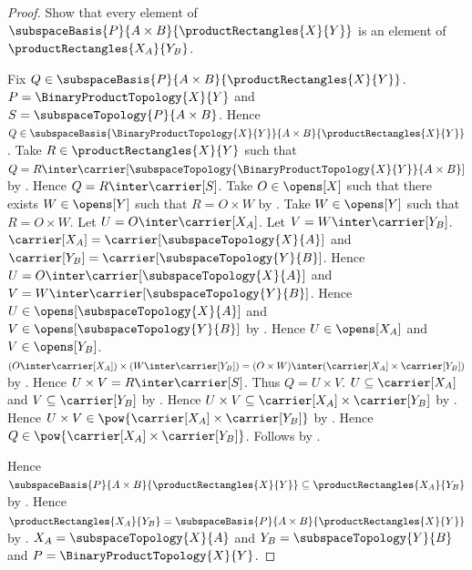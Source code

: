 \begin{proof}
    Show that every element of
        $\subspaceBasis{P}{A\times B}{\productRectangles{X}{Y}}$
        is an element of $\productRectangles{X_A}{Y_B}$.
    \begin{subproof}
        Fix $Q\in
            \subspaceBasis{P}{A\times B}{\productRectangles{X}{Y}}$.
        $P=\BinaryProductTopology{X}{Y}$ and
            $S=\subspaceTopology{P}{A\times B}$.
        Hence $Q\in\subspaceBasis{
            \BinaryProductTopology{X}{Y}}{A\times B}{
                \productRectangles{X}{Y}}$.
        Take $R\in\productRectangles{X}{Y}$ such that
            $Q=R\inter\carrier[\subspaceTopology{
                \BinaryProductTopology{X}{Y}}{A\times B}]$ by
            .
        Hence $Q=R\inter\carrier[S]$.
        Take $O\in\opens[X]$ such that there exists $W\in\opens[Y]$
            such that $R=O\times W$ by .
        Take $W\in\opens[Y]$ such that $R=O\times W$.
        Let $U=O\inter\carrier[X_A]$.
        Let $V=W\inter\carrier[Y_B]$.
        $\carrier[X_A]=\carrier[\subspaceTopology{X}{A}]$ and
            $\carrier[Y_B]=\carrier[\subspaceTopology{Y}{B}]$.
        Hence $U=O\inter\carrier[\subspaceTopology{X}{A}]$ and
            $V=W\inter\carrier[\subspaceTopology{Y}{B}]$.
        Hence $U\in\opens[\subspaceTopology{X}{A}]$ and
            $V\in\opens[\subspaceTopology{Y}{B}]$ by
            .
        Hence $U\in\opens[X_A]$ and $V\in\opens[Y_B]$.
        $(O\inter\carrier[X_A])\times
            (W\inter\carrier[Y_B])
            =(O\times W)\inter
                (\carrier[X_A]\times\carrier[Y_B])$ by
            .
        Hence $U\times V=R\inter\carrier[S]$.
        Thus $Q=U\times V$.
        $U\subseteq\carrier[X_A]$ and $V\subseteq\carrier[Y_B]$ by
            .
        Hence $U\times V\subseteq\carrier[X_A]\times\carrier[Y_B]$ by
            .
        Hence $U\times V\in\pow{\carrier[X_A]\times\carrier[Y_B]}$ by
            .
        Hence $Q\in\pow{\carrier[X_A]\times\carrier[Y_B]}$.
        Follows by .
    \end{subproof}
    Hence $\subspaceBasis{P}{A\times B}{\productRectangles{X}{Y}}
        \subseteq\productRectangles{X_A}{Y_B}$ by .
    Hence $\productRectangles{X_A}{Y_B}
        =\subspaceBasis{P}{A\times B}{\productRectangles{X}{Y}}$ by
        .
    $X_A=\subspaceTopology{X}{A}$ and
        $Y_B=\subspaceTopology{Y}{B}$ and
        $P=\BinaryProductTopology{X}{Y}$.
\end{proof}

